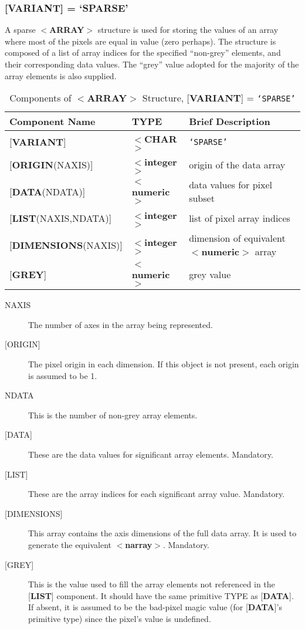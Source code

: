 \documentclass[twoside,11pt]{article}
\renewcommand{\_}{\texttt{\symbol{95}}}
\begin{document}
\subsubsection{{[}{\bf VARIANT}{]} = `SPARSE'}
A sparse \mbox{$<${\bf ARRAY}$>$} structure is used for storing
the values of an array where most of the pixels are equal in value
(zero perhaps).
The structure is composed of a list of array indices for the
specified ``non-grey''
elements, and their corresponding data values.
The ``grey'' value adopted for the majority of the array elements is
also supplied.

\begin{table}[htb]
\centering
\caption{Components of $<${\bf ARRAY}$>$ Structure, {[}{\bf VARIANT}{]} = {\tt `SPARSE'}}
\begin{tabular}{|l|l|l|}
\hline
Component Name & TYPE & Brief Description \\  \hline
{[}{\bf VARIANT}{]} & $<${\bf \_CHAR}$>$ & {\tt `SPARSE'} \\
{[}{\bf ORIGIN}(NAXIS){]} & $<${\bf integer}$>$ & origin of the data array \\
{[}{\bf DATA}(NDATA){]} & $<${\bf numeric}$>$ & data values for pixel subset \\
{[}{\bf LIST}(NAXIS,NDATA){]} & $<${\bf integer}$>$ & list of pixel array indices \\
{[}{\bf DIMENSIONS}(NAXIS){]} & $<${\bf integer}$>$ &
dimension of equivalent $<${\bf numeric}$>$ array \\
{[}{\bf GREY}{]} & $<${\bf numeric}$>$ & grey value \\ \hline
\end{tabular}
\end{table}

\begin{description}
\item [NAXIS]
The number of axes in the array being represented.
\item [{[}ORIGIN{]}]
The pixel origin in each dimension.  If this object is not present,
each origin is assumed to be 1. 
\item [NDATA]
This is the number of non-grey array elements.
\item [{[}DATA{]}]
These are the data values for significant array elements.
Mandatory.
\item [{[}LIST{]}]
These are the array indices for each significant array value.
Mandatory.
\item [{[}DIMENSIONS{]}]
This array contains the axis dimensions of the full data array.
It is used to generate the equivalent $<${\bf narray}$>$.
Mandatory.
\item [{[}GREY{]}]
This is the value used to fill the array elements not
referenced in the {[}{\bf LIST}{]} component.  It should
have the same primitive
TYPE as {[}{\bf DATA}{]}.  If absent,
it is assumed to be
the bad-pixel magic value
(for {[}{\bf DATA}{]}'s primitive type) since the pixel's
value is undefined.
\end{description}
\end{document}
